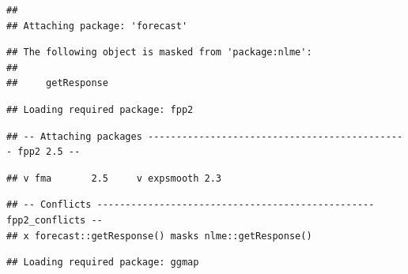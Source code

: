 \documentclass[
]{article}
\begin{document}
\begin{verbatim}
## 
## Attaching package: 'forecast'
\end{verbatim}

\begin{verbatim}
## The following object is masked from 'package:nlme':
## 
##     getResponse
\end{verbatim}

\begin{verbatim}
## Loading required package: fpp2
\end{verbatim}

\begin{verbatim}
## -- Attaching packages ---------------------------------------------- fpp2 2.5 --
\end{verbatim}

\begin{verbatim}
## v fma       2.5     v expsmooth 2.3
\end{verbatim}

\begin{verbatim}
## -- Conflicts ------------------------------------------------- fpp2_conflicts --
## x forecast::getResponse() masks nlme::getResponse()
\end{verbatim}

\begin{verbatim}
## Loading required package: ggmap
\end{verbatim}
\end{document}
